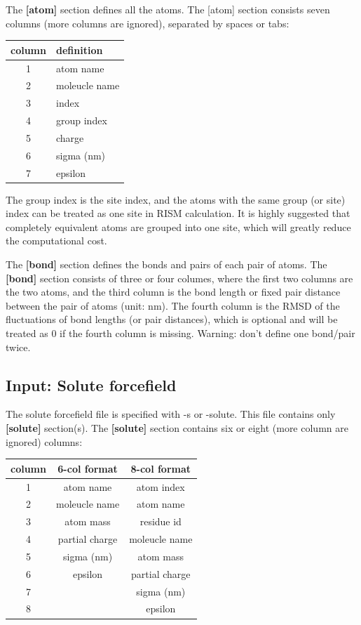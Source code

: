 \documentclass[aip,amsmath,amssymb,reprint,onecolumn]{revtex4-1}
\begin{document}
The {\bf [atom]} section defines all the atoms. The [atom] section consists seven columns (more columns are ignored), separated by spaces or tabs:

\begin{center}\begin{tabular}{|c|l|}
    \hline
    column & definition \\
    \hline
    1 & atom name \\
    2 & moleucle name\\
    3 & index \\
    4 & group index \\
    5 & charge \\
    6 & sigma (nm) \\
    7 & epsilon \\
    \hline
\end{tabular}\end{center}

The group index is the site index, and the atoms with the same group (or site) index can be treated as one site in RISM calculation. It is highly suggested that completely equivalent atoms are grouped into one site, which will greatly reduce the computational cost.

The {\bf [bond]} section defines the bonds and pairs of each pair of atoms. The {\bf [bond]} section consists of three or four columes, where the first two columns are the two atoms, and the third column is the bond length or fixed pair distance between the pair of atoms (unit: nm). The fourth column is the RMSD of the fluctuations of bond lengths (or pair distances), which is optional and will be treated as $0$ if the fourth column is missing. Warning: don't define one bond/pair twice.


\subsection{Input: Solute forcefield}\label{sec:io.solute}

The solute forcefield file is specified with -s or -solute. This file contains only {\bf [solute]} section(s). The {\bf [solute]} section contains six or eight (more column are ignored) columns:

\begin{center}\begin{tabular}{|c|c|c|}
    \hline
    column & 6-col format & 8-col format \\
    \hline
    1 & atom name & atom index \\
    2 & moleucle name & atom name \\
    3 & atom mass & residue id \\
    4 & partial charge & moleucle name \\
    5 & sigma (nm) & atom mass \\
    6 & epsilon & partial charge \\
    7 & & sigma (nm) \\
    8 & & epsilon \\
    \hline
\end{tabular}\end{center}
\end{document}
